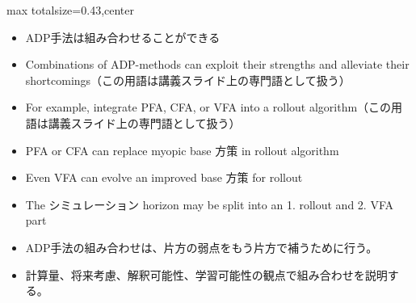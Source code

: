 \clearpage
{}
\begin{minipage}[t]{0.405\textwidth}
\begin{adjustbox}{max totalsize={\textwidth}{0.43\textheight},center}
\begin{minipage}{\textwidth}\scriptsize
{}\begin{itemize}
\item ADP手法は組み合わせることができる
\item Combinations of ADP-methods can exploit their strengths and alleviate their shortcomings（この用語は講義スライド上の専門語として扱う）
\item For example, integrate PFA, CFA, or VFA into a rollout algorithm（この用語は講義スライド上の専門語として扱う）
\item PFA or CFA can replace myopic base 方策 in rollout algorithm
\item Even VFA can evolve an improved base 方策 for rollout
\item The シミュレーション horizon may be split into an 1. rollout and 2. VFA part
\end{itemize}\begin{itemize}
\item ADP手法の組み合わせは、片方の弱点をもう片方で補うために行う。
\item 計算量、将来考慮、解釈可能性、学習可能性の観点で組み合わせを説明する。
\end{itemize}
\end{minipage}
\end{adjustbox}
\end{minipage}\hfill
